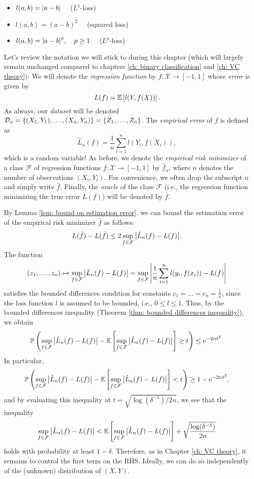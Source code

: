 \begin{itemize}
    \item $l(a, b) = \abs{a - b} \quad$ ($L^1$-loss)
    
    \item $l(a, b) = (a - b)^2 \quad$ (squared loss)

    \item $l(a, b) = \abs{a - b}^p, \quad p \geq 1 \quad$ ($L^p$-loss)
\end{itemize}

Let's review the notation we will stick to during this chapter (which will largely remain unchanged compared to chapters \ref{ch: binary classification} and \ref{ch: VC theory}): We will denote the \emph{regression function} by $f \colon \mathcal{X} \to [-1, 1]$ whose \emph{error} is given by
\[
    L(f) = \mathbb{E}\left[l(Y, f(X))\right].
\]
As always, our \emph{dataset} will be denoted $\mathcal{D}_n = \left\{(X_1, Y_1), \dots, (X_n, Y_n)\right\} = \left\{Z_1, \dots, Z_n\right\}$. The \emph{empirical error} of $f$ is defined as
\[
    \hat L_n(f) = \frac{1}{n} \sum_{i=1}^n l(Y_i, f(X_i)),
\]
which is a random variable! As before, we denote the \emph{empirical risk minimizer} of a class $\mathcal{F}$ of regression functions $f \colon \mathcal{X} \to [-1, 1]$ by $\hat f_n$, where $n$ denotes the number of observations $(X_i, Y_i)$. For convenience, we often drop the subscript $n$ and simply write $\hat f$. Finally, the \emph{oracle} of the class $\mathcal{F}$ (i.e., the regression function minimizing the true error $L(f)$) will be denoted by $\bar f$.

By Lemma \ref{lem: bound on estimation error}, we can bound the estimation error of the empirical risk minimizer $\hat f$ as follows:
\[
    L(\hat f) - L(\bar f) \leq 2 \sup_{f \in \mathcal{F}} \big\lvert\hat L_n(f) - L(f)\big\rvert.
\]
The function
\[
    (z_1, \dots, z_n) \mapsto \sup_{f \in \mathcal{F}} \big\lvert\hat L_n(f) - L(f)\big\rvert = \sup_{f \in \mathcal{F}} \abs{ \frac{1}{n} \sum_{i=1}^n l(y_i, f(x_i)) - L(f) }
\]
satisfies the bounded differences condition for constants $c_1 = \dots = c_n = \frac{1}{n}$, since the loss function $l$ is assumed to be bounded, i.e., $0 \leq l \leq 1$. Thus, by the bounded differences inequality (Theorem \ref{thm: bounded differences inequality}), we obtain
\[
    \mathbb{P}\left( \sup_{f \in \mathcal{F}} \big\lvert\hat L_n(f) - L(f)\big\rvert - \mathbb{E}\left[ \sup_{f \in \mathcal{F}} \big\lvert\hat L_n(f) - L(f)\big\rvert \right] \geq t \right) \leq \mathrm{e}^{-2nt^2}.
\]
In particular,
\[
    \mathbb{P}\left( \sup_{f \in \mathcal{F}} \big\lvert\hat L_n(f) - L(f)\big\rvert - \mathbb{E}\left[ \sup_{f \in \mathcal{F}} \big\lvert\hat L_n(f) - L(f)\big\rvert \right] < t \right) \geq 1 - \mathrm{e}^{-2nt^2},
\]
and by evaluating this inequality at $t = \sqrt{\log(\delta^{-1})/2n}$, we see that the inequality
\[
    \sup_{f \in \mathcal{F}} \big\lvert\hat L_n(f) - L(f)\big\rvert < \mathbb{E}\left[ \sup_{f \in \mathcal{F}} \big\lvert\hat L_n(f) - L(f)\big\rvert \right] + \sqrt{ \frac{\log(\delta^{-1})}{2n} }
\]
holds with probability at least $1 - \delta$. Therefore, as in Chapter \ref{ch: VC theory}, it remains to control the first term on the RHS. Ideally, we can do so independently of the (unknown) distribution of $(X, Y)$.
